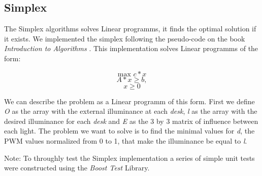 \subsection{Simplex}
\label{sec:Simplex}

The Simplex algorithms solves Linear programms, it finds the optimal solution if it exists.
We implemented the simplex following the pseudo-code on the book \emph{Introduction to Algorithms} \cite{Cormen}.
This implementation solves Linear programms of the form:

$$ \text{max }c*x $$
$$    A*x \geq b, $$
$$    x \geq 0 $$

We can describe the problem as a Linear programm of this form. First we define \emph{O} as the array with the external illuminance at each \emph{desk}, \emph{l} as the array with the desired illuminance for each \emph{desk} and \emph{E} as the  3 by 3 matrix of influence between each light. The problem we want to solve is to find the minimal values for \emph{d}, the PWM values normalized from 0 to 1, that make the illuminance be equal to \emph{l}.


Note: To throughly test the Simplex implementation a series of simple unit tests were constructed using the \emph{Boost Test} Library.
